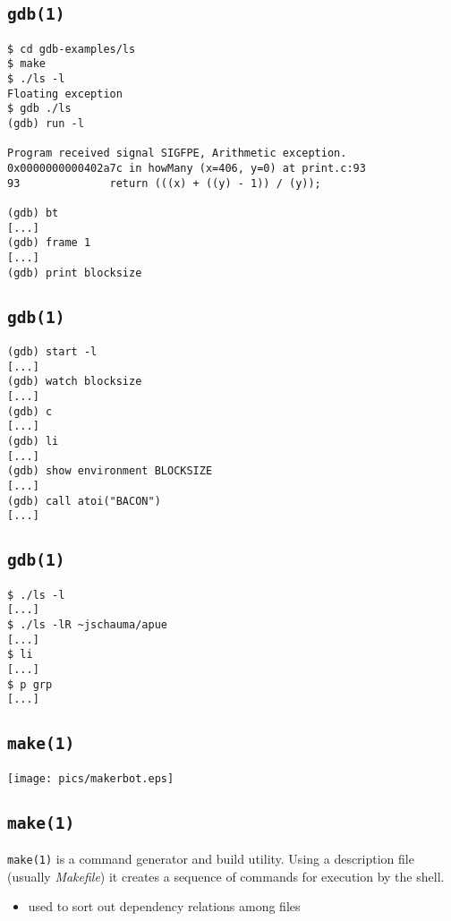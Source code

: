 \documentclass[xga]{xdvislides}
\begin{document}
\subsection{{\tt gdb(1)}}
\begin{verbatim}
$ cd gdb-examples/ls
$ make
$ ./ls -l
Floating exception
$ gdb ./ls
(gdb) run -l

Program received signal SIGFPE, Arithmetic exception.
0x0000000000402a7c in howMany (x=406, y=0) at print.c:93
93              return (((x) + ((y) - 1)) / (y));

(gdb) bt
[...]
(gdb) frame 1
[...]
(gdb) print blocksize
\end{verbatim}

\subsection{{\tt gdb(1)}}
\begin{verbatim}
(gdb) start -l
[...]
(gdb) watch blocksize
[...]
(gdb) c
[...]
(gdb) li
[...]
(gdb) show environment BLOCKSIZE
[...]
(gdb) call atoi("BACON")
[...]
\end{verbatim}

\subsection{{\tt gdb(1)}}
\begin{verbatim}
$ ./ls -l
[...]
$ ./ls -lR ~jschauma/apue
[...]
$ li
[...]
$ p grp
[...]
\end{verbatim}

\subsection{{\tt make(1)}}

\begin{center}
	\texttt{[image: pics/makerbot.eps]}
\end{center}

\subsection{{\tt make(1)}}
{\tt make(1)} is a command generator and build utility. Using a
description file (usually {\em Makefile}) it creates a sequence of
commands for execution by the shell.

\begin{itemize}
	\item used to sort out dependency relations among files
\end{itemize}
\end{document}
